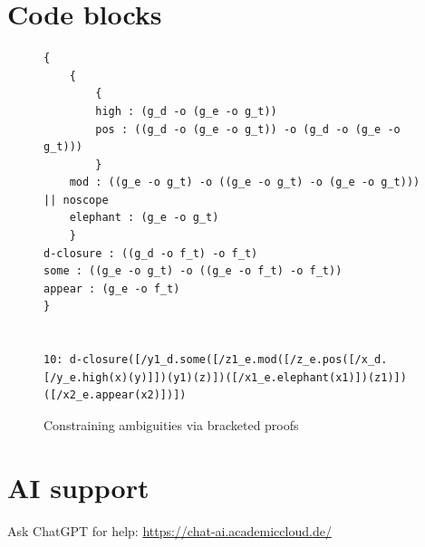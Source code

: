 \newpage

\section{Code blocks}

\begin{figure}[h!]
\begin{center}
\begin{minipage}{.72\textwidth}
\begin{lstlisting}
{
    {
        {
        high : (g_d -o (g_e -o g_t))
        pos : ((g_d -o (g_e -o g_t)) -o (g_d -o (g_e -o g_t))) 
        }
    mod : ((g_e -o g_t) -o ((g_e -o g_t) -o (g_e -o g_t))) || noscope
    elephant : (g_e -o g_t)
    }
d-closure : ((g_d -o f_t) -o f_t)
some : ((g_e -o g_t) -o ((g_e -o f_t) -o f_t))
appear : (g_e -o f_t)
}


10: d-closure([/y1_d.some([/z1_e.mod([/z_e.pos([/x_d.[/y_e.high(x)(y)]])(y1)(z)])([/x1_e.elephant(x1)])(z1)])([/x2_e.appear(x2)])])
\end{lstlisting}
\end{minipage}
\end{center}
\vspace{-5mm}
\caption{Constraining ambiguities via bracketed proofs}
\label{fig:adj-comp-constrained}
\end{figure}

\section{AI support}

Ask ChatGPT for help: \url{https://chat-ai.academiccloud.de/}